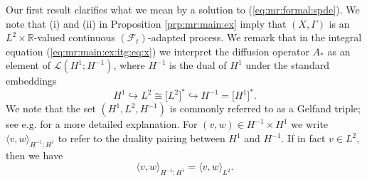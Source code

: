 \documentclass[10pt]{articleHJ}
\newcommand{\Real}{\mathbb{R}}							%
\newcommand{\sref}[1]{(\ref{#1})}                       %
\numberwithin{equation}{section}
\begin{document}
Our first result clarifies
what we mean by a solution
to \sref{eq:mr:formal:spde}.
We note that (i) and (ii) in Proposition \ref{prp:mr:main:ex} imply that $(X, \Gamma)$
is an
$L^2 \times \Real$-valued continuous $(\mathcal{F}_t)$-adapted process.
We remark that in the integral equation \sref{eq:mr:main:ex:itg:eq:x}
we interpret the diffusion operator $A_*$ as an
element of $\mathcal{L}( H^1 ; H^{-1})$,
where $H^{-1}$ is the dual of $H^1$ under the standard
embeddings
\begin{equation}
H^1 \hookrightarrow L^2 \cong \big[L^2\big]^* \hookrightarrow H^{-1} = \big[H^{1}\big]^*.
\end{equation}
We note that the set $(H^1, L^2, H^{-1})$ is commonly referred to as
a Gelfand triple; see e.g. \cite[{\S}5.9]{Evans} for a more detailed explanation.
For $(v, w) \in H^{-1} \times H^1$ we write $\langle v, w \rangle_{H^{-1}; H^1}$
to refer to the duality pairing between $H^1$ and $H^{-1}$. If in fact $v \in L^2$, then we have
\begin{equation}
\langle v, w \rangle_{H^{-1}; H^1} = \langle v, w \rangle_{L^2}.
\end{equation}

\end{document}
